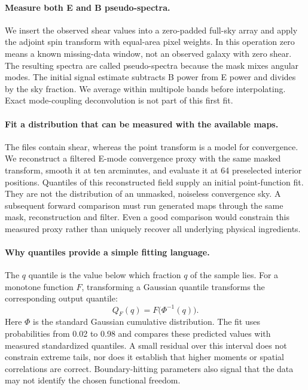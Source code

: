 \documentclass[11pt]{article}
\begin{document}
\paragraph{Measure both E and B pseudo-spectra.}
We insert the observed shear values into a zero-padded full-sky array and
apply the adjoint spin transform with equal-area pixel weights. In this
operation zero means a known missing-data window, not an observed galaxy
with zero shear. The resulting spectra are called pseudo-spectra because
the mask mixes angular modes. The initial signal estimate subtracts B
power from E power and divides by the sky fraction. We average within
multipole bands before interpolating. Exact mode-coupling deconvolution
is not part of this first fit.

\paragraph{Fit a distribution that can be measured with the available maps.}
The files contain shear, whereas the point transform is a model for
convergence. We reconstruct a filtered E-mode convergence proxy with the
same masked transform, smooth it at ten arcminutes, and evaluate it at
64 preselected interior positions. Quantiles of this reconstructed field
supply an initial point-function fit. They are not the distribution of
an unmasked, noiseless convergence sky. A subsequent forward comparison
must run generated maps through the same mask, reconstruction and filter.
Even a good comparison would constrain this measured proxy rather than
uniquely recover all underlying physical ingredients.

\paragraph{Why quantiles provide a simple fitting language.}
The $q$ quantile is the value below which fraction $q$ of the sample lies.
For a monotone function $F$, transforming a Gaussian quantile transforms
the corresponding output quantile:
\begin{equation}
 Q_F(q)=F\bigl(\Phi^{-1}(q)\bigr).
\end{equation}
Here $\Phi$ is the standard Gaussian cumulative distribution. The fit
uses probabilities from 0.02 to 0.98 and compares these predicted values
with measured standardized quantiles. A small residual over this interval
does not constrain extreme tails, nor does it establish that higher
moments or spatial correlations are correct. Boundary-hitting parameters
also signal that the data may not identify the chosen functional freedom.
\end{document}
